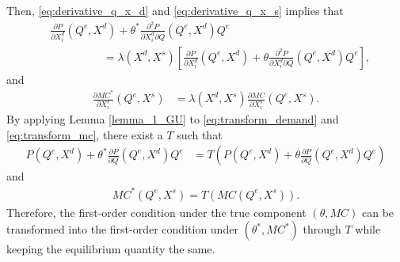 \documentclass[11pt, a4paper]{article}
\theoremstyle{remark}
\begin{document}




Then, \eqref{eq:derivative_q_x_d} and \eqref{eq:derivative_q_x_s} implies that 
\begin{align}
    &\frac{\partial P}{\partial X^{d}_{i}}(Q^e, X^{d}) + \theta^{*}\frac{\partial^2 P}{\partial X^{d}_{i}\partial Q}(Q^e, X^{d})Q^e \\
    &\hspace{2cm} = \lambda(X^{d}, X^{s})\left[\frac{\partial P}{\partial X^{d}_{i}} (Q^e, X^{d})+ \theta \frac{\partial^2 P}{\partial X^{d}_{i}\partial Q}(Q^e, X^{d})Q^e\right],\label{eq:transform_demand}
\end{align}
and
\begin{align}
    \frac{\partial MC^{*}}{\partial X^{s}_{i}}(Q^e, X^{s}) & = \lambda(X^{d}, X^{s})\frac{\partial MC}{\partial X^{s}_{i}}(Q^e, X^{s}).\label{eq:transform_mc}
\end{align}
By applying Lemma \ref{lemma_1_GU} to \eqref{eq:transform_demand} and \eqref{eq:transform_mc}, there exist a $T$ such that
\begin{align}
    P(Q^e, X^{d}) + \theta^{*} \frac{\partial P}{\partial Q}(Q^e, X^{d}) Q^e & = T\left(P(Q^e, X^{d}) + \theta \frac{\partial P}{\partial Q}(Q^e, X^{d}) Q^e\right) \label{eq:transformation_T_demand}
\end{align}
and
\begin{align}
    MC^{*}(Q^e, X^{s}) = T(MC(Q^e, X^{s})). \label{eq:transformation_T_mc}
\end{align}
Therefore, the first-order condition under the true component $(\theta, MC)$ can be transformed into the first-order condition under $(\theta^*, MC^*)$ through $T$ while keeping the equilibrium quantity the same.
\end{document}
